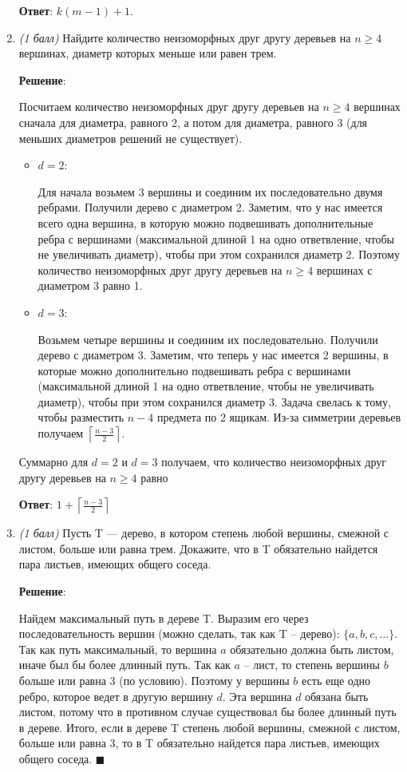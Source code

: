 \documentclass{article}
\begin{document}
\begin{enumerate}
    \textbf{Ответ}: $k(m-1)+1$.

    \item \textit{(1 балл)} Найдите количество неизоморфных друг другу деревьев на $n \geq 4$ вершинах, диаметр которых меньше или равен трем.
    
    \textbf{Решение}:
    
    Посчитаем количество неизоморфных друг другу деревьев на $n \geq 4$ вершинах сначала для диаметра, равного 2, а потом для диаметра, равного 3 (для меньших диаметров решений не существует).
    \begin{itemize}
        \item $d = 2$:
        
        Для начала возьмем 3 вершины и соединим их последовательно двумя ребрами. Получили дерево с диаметром 2. Заметим, что у нас имеется всего одна вершина, в которую можно подвешивать дополнительные ребра с вершинами (максимальной длиной 1 на одно ответвление, чтобы не увеличивать диаметр), чтобы при этом сохранился диаметр 2. Поэтому количество неизоморфных друг другу деревьев на $n \geq 4$ вершинах с диаметром 3 равно 1.

        \item $d = 3$:
        
        Возьмем четыре вершины и соединим их последовательно. Получили дерево с диаметром 3. Заметим, что теперь у нас имеется 2 вершины, в которые можно дополнительно подвешивать ребра с вершинами (максимальной длиной 1 на одно ответвление, чтобы не увеличивать диаметр), чтобы при этом сохранился диаметр 3. Задача свелась к тому, чтобы разместить $n-4$ предмета по 2 ящикам. Из-за симметрии деревьев получаем $\left\lceil\frac{n-3}{2}\right\rceil$. 
    \end{itemize}
    Суммарно для $d=2$ и $d=3$ получаем, что количество неизоморфных друг другу деревьев на $n \geq 4$ равно
    
    \textbf{Ответ}: $1 + \left\lceil\frac{n-3}{2}\right\rceil$
    
    \item \textit{(1 балл)} Пусть T — дерево, в котором степень любой вершины, смежной с листом, больше или равна трем. Докажите, что в T обязательно найдется пара листьев, имеющих общего соседа.
    
    \textbf{Решение}:
    
    Найдем максимальный путь в дереве T. Выразим его через последовательность вершин (можно сделать, так как T -- дерево): $\{a, b, c, \dots\}$. Так как путь максимальный, то вершина $a$ обязательно должна быть листом, иначе был бы более длинный путь. Так как $a$ -- лист, то степень вершины $b$ больше или равна 3 (по условию). Поэтому у вершины $b$ есть еще одно ребро, которое ведет в другую вершину $d$. Эта вершина $d$ обязана быть листом, потому что в противном случае существовал бы более длинный путь в дереве. Итого, если в дереве T степень любой вершины, смежной с листом, больше или равна 3, то в T обязательно найдется пара листьев, имеющих общего соседа. $\blacksquare$


\end{enumerate}
\end{document}

